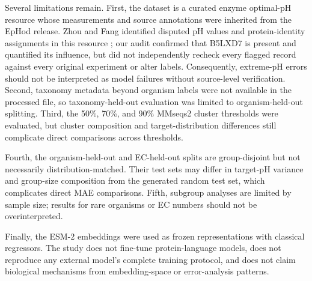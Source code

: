 Several limitations remain. First, the dataset is a curated enzyme optimal-pH resource whose measurements and source annotations were inherited from the EpHod release. Zhou and Fang identified disputed pH values and protein-identity assignments in this resource \cite{zhou2026caution}; our audit confirmed that B5LXD7 is present and quantified its influence, but did not independently recheck every flagged record against every original experiment or alter labels. Consequently, extreme-pH errors should not be interpreted as model failures without source-level verification. Second, taxonomy metadata beyond organism labels were not available in the processed file, so taxonomy-held-out evaluation was limited to organism-held-out splitting. Third, the 50\%, 70\%, and 90\% MMseqs2 cluster thresholds were evaluated, but cluster composition and target-distribution differences still complicate direct comparisons across thresholds.

Fourth, the organism-held-out and EC-held-out splits are group-disjoint but not necessarily distribution-matched. Their test sets may differ in target-pH variance and group-size composition from the generated random test set, which complicates direct MAE comparisons. Fifth, subgroup analyses are limited by sample size; results for rare organisms or EC numbers should not be overinterpreted.

Finally, the ESM-2 embeddings were used as frozen representations with classical regressors. The study does not fine-tune protein-language models, does not reproduce any external model's complete training protocol, and does not claim biological mechanisms from embedding-space or error-analysis patterns.
